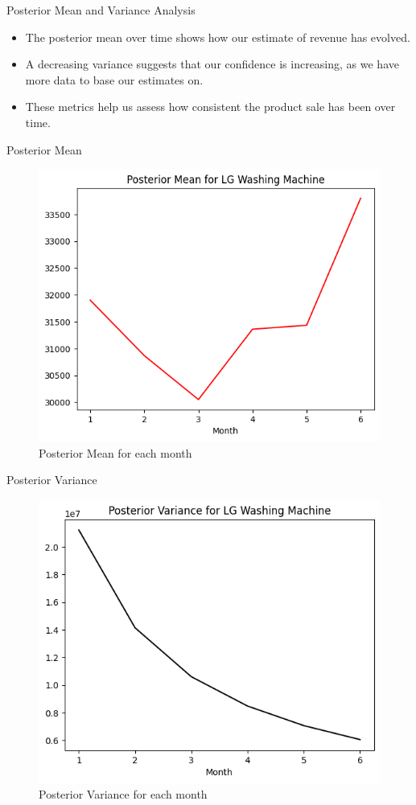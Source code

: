 \begin{frame}{Posterior Mean and Variance Analysis}

\begin{itemize}
  \item The posterior mean over time shows how our estimate of revenue has evolved.
  \item A decreasing variance suggests that our confidence is increasing, as we have more data to base our estimates on.
  \item These metrics help us assess how consistent the product sale has been over time.
\end{itemize}

\end{frame}

\begin{frame}{Posterior Mean}

\begin{figure}
  \centering
  \includegraphics[width=.8\linewidth]{../Report/images/mean.png}
  \caption{Posterior Mean for each month}
\end{figure}

\end{frame}

\begin{frame}{Posterior Variance}

\begin{figure}
  \centering
  \includegraphics[width=.8\linewidth]{../Report/images/var.png}
  \caption{Posterior Variance for each month}
\end{figure}

\end{frame}